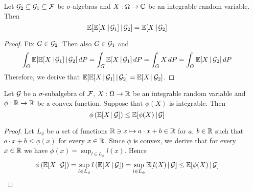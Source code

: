 \begin{theorem}\label{theorem:towerproperty}
Let ${\mathcal G}_2\subseteq {\mathcal G}_1\subseteq {\mathcal F}$ be $\sigma$-algebras and $X:\Omega \rightarrow {\mathbb C}$ be an integrable random variable. Then
$${\mathbb E}[{\mathbb E}[X\,|\,{\mathcal G}_1]\,|\,{\mathcal G}_2] = {\mathbb E}[X\,|\,{\mathcal G}_2]$$
\end{theorem}
\begin{proof}
Fix $G\in {\mathcal G}_2$. Then also $G\in {\mathcal G}_1$ and
$$\int_G{\mathbb E}[{\mathbb E}[X\,|\,{\mathcal G}_1]\,|\,{\mathcal G}_2]\,dP = \int_G {\mathbb E}[X\,|\,{\mathcal G}_1]\,dP = \int_G X\,dP = \int_G {\mathbb E}[X\,|\,{\mathcal G}_2]\,dP$$ 
Therefore, we derive that ${\mathbb E}[{\mathbb E}[X\,|\,{\mathcal G}_1]\,|\,{\mathcal G}_2] = {\mathbb E}[X\,|\,{\mathcal G}_2]$.
\end{proof}

\begin{theorem}\label{theorem:Jenseninequality}
Let ${\mathcal G}$ be a $\sigma$-subalgebra of ${\mathcal F}$, $X:\Omega \rightarrow {\mathbb R}$ be an integrable random variable and $\phi:{\mathbb R}\rightarrow {\mathbb R}$ be a convex function. Suppose that $\phi(X)$ is integrable. Then
$$\phi\left({\mathbb E}[X\,|\,{\mathcal G}]\right)\leq {\mathbb E}[\phi(X)\,|\,{\mathcal G}]$$
\end{theorem}
\begin{proof}
Let $L_{\phi}$ be a set of functions ${\mathbb R}\ni x\mapsto a\cdot x+b\in {\mathbb R}$ for $a$, $b\in {\mathbb R}$ such that $a\cdot x+b\leq \phi(x)$ for every $x\in {\mathbb R}$. Since $\phi$ is convex, we derive that for every $x\in {\mathbb R}$ we have $\phi(x) = \sup_{l\in L_{\phi}}l(x)$. Hence
$$\phi\left({\mathbb E}[X\,|\,{\mathcal G}]\right)=\sup_{l\in L_{\phi}} l\left({\mathbb E}[X\,|\,{\mathcal G}]\right) = \sup_{l\in L_{\phi}}{\mathbb E}[l(X)\,|\,{\mathcal G}]\leq {\mathbb E}[\phi(X)\,|\,{\mathcal G}]$$
\end{proof}




































































\small



